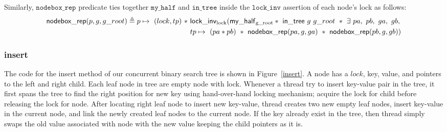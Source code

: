 \documentclass[acmsmall,screen]{acmart}\settopmatter{printfolios=true}
\begin{document}
Similarly,  $\texttt{nodebox\_rep}$ predicate ties together $\texttt{my\_half}$ and $\texttt{in\_tree}$ inside the $\texttt{lock\_inv}$ assertion of each node's lock as follows:
\begin{align*}\mathsf{nodebox\_rep}(p,g,g\_root) \triangleq  p\mapsto\ (lock,tp)\ *\ &\mathsf{lock\_inv\textsubscript{lock}}(\mathsf{my\_half\textsubscript{g\_root}} *\ \mathsf{in\_tree}\ g\ g\_root\ *\ \exists\ pa,\ pb,\ ga,\ gb, \\&tp\mapsto\ (pa * pb)\ *\  \mathsf{nodebox\_rep}(pa,g,ga)\ *\ \mathsf{nodebox\_rep}(pb,g,gb))\end{align*}
 
\subsubsection{insert}
The code for the insert method of our concurrent binary search tree is shown in Figure~\ref{insert}. A node has a $lock$, key, value, and pointers to the left and right child. Each leaf node in tree are empty node with lock. Whenever a thread try to insert key-value pair in the tree, it first spans the tree to find the right position for new key using hand-over-hand locking mechanism; acquire the lock for child before releasing the lock for node. After locating right leaf node to insert new key-value, thread creates two new empty leaf nodes, insert key-value in the current node, and link the newly created leaf nodes to the current node. If the key already exist in the tree, then thread simply swaps the old value associated with node with the new value keeping the child pointers as it is.
\end{document}
